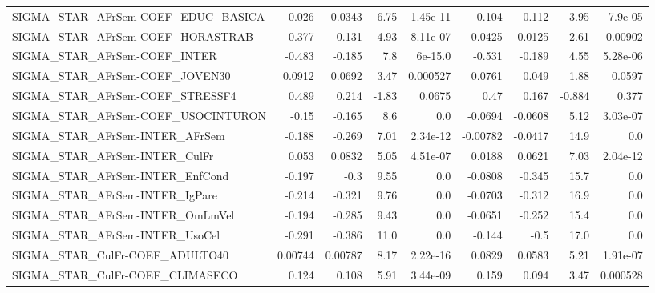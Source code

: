 \begin{tabular}{lrrrrrrrr}
SIGMA\_STAR\_AFrSem-COEF\_EDUC\_BASICA    &       0.026 &       0.0343 &    6.75 & 1.45e-11 &     -0.104 &      -0.112 &         3.95 &       7.9e-05 \\
SIGMA\_STAR\_AFrSem-COEF\_HORASTRAB      &      -0.377 &       -0.131 &    4.93 & 8.11e-07 &     0.0425 &      0.0125 &         2.61 &       0.00902 \\
SIGMA\_STAR\_AFrSem-COEF\_INTER          &      -0.483 &       -0.185 &     7.8 &  6e-15.0 &     -0.531 &      -0.189 &         4.55 &      5.28e-06 \\
SIGMA\_STAR\_AFrSem-COEF\_JOVEN30        &      0.0912 &       0.0692 &    3.47 & 0.000527 &     0.0761 &       0.049 &         1.88 &        0.0597 \\
SIGMA\_STAR\_AFrSem-COEF\_STRESSF4       &       0.489 &        0.214 &   -1.83 &   0.0675 &       0.47 &       0.167 &       -0.884 &         0.377 \\
SIGMA\_STAR\_AFrSem-COEF\_USOCINTURON    &       -0.15 &       -0.165 &     8.6 &      0.0 &    -0.0694 &     -0.0608 &         5.12 &      3.03e-07 \\
SIGMA\_STAR\_AFrSem-INTER\_AFrSem        &      -0.188 &       -0.269 &    7.01 & 2.34e-12 &   -0.00782 &     -0.0417 &         14.9 &           0.0 \\
SIGMA\_STAR\_AFrSem-INTER\_CulFr         &       0.053 &       0.0832 &    5.05 & 4.51e-07 &     0.0188 &      0.0621 &         7.03 &      2.04e-12 \\
SIGMA\_STAR\_AFrSem-INTER\_EnfCond       &      -0.197 &         -0.3 &    9.55 &      0.0 &    -0.0808 &      -0.345 &         15.7 &           0.0 \\
SIGMA\_STAR\_AFrSem-INTER\_IgPare        &      -0.214 &       -0.321 &    9.76 &      0.0 &    -0.0703 &      -0.312 &         16.9 &           0.0 \\
SIGMA\_STAR\_AFrSem-INTER\_OmLmVel       &      -0.194 &       -0.285 &    9.43 &      0.0 &    -0.0651 &      -0.252 &         15.4 &           0.0 \\
SIGMA\_STAR\_AFrSem-INTER\_UsoCel        &      -0.291 &       -0.386 &    11.0 &      0.0 &     -0.144 &        -0.5 &         17.0 &           0.0 \\
SIGMA\_STAR\_CulFr-COEF\_ADULTO40        &     0.00744 &      0.00787 &    8.17 & 2.22e-16 &     0.0829 &      0.0583 &         5.21 &      1.91e-07 \\
SIGMA\_STAR\_CulFr-COEF\_CLIMASECO       &       0.124 &        0.108 &    5.91 & 3.44e-09 &      0.159 &       0.094 &         3.47 &      0.000528 \\

\end{tabular}
